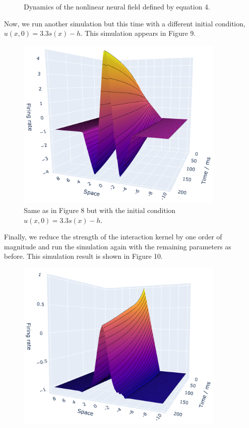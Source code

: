 \documentclass[12pt]{article}
\begin{document}
\begin{enumerate}
\begin{figure}[H]
    \caption{Dynamics of the nonlinear neural field defined by equation 4.}
\end{figure}
Now, we run another simulation but this time with a different initial condition, $u(x, 0)=3.3s(x)-h$. This simulation appears in Figure 9.
\begin{figure}[H]
    \centering
    \includegraphics[width=0.9\textwidth]{./figure9.png}
    \caption{Same as in Figure 8 but with the initial condition $u(x, 0)=3.3s(x)-h$.}
\end{figure}
Finally, we reduce the strength of the interaction kernel by one order of magnitude and run the simulation again with the remaining parameters as before.
This simulation result is shown in Figure 10.
\begin{figure}[H]
    \centering
    \includegraphics[width=0.9\textwidth]{./figure10.png}

\end{figure}
\end{enumerate}
\end{document}

